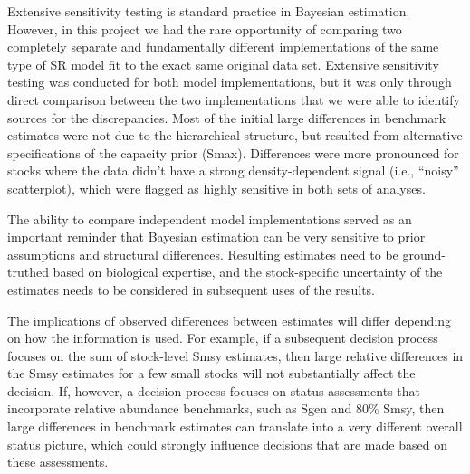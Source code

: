 \documentclass[french,11pt]{book}
\begin{document}
Extensive sensitivity testing is standard practice in Bayesian estimation. However, in this project we had the rare opportunity of comparing two completely separate and fundamentally different implementations of the same type of SR model fit to the exact same original data set. Extensive sensitivity testing was conducted for both model implementations, but it was only through direct comparison between the two implementations that we were able to identify sources for the discrepancies. Most of the initial large differences in benchmark estimates were not due to the hierarchical structure, but resulted from alternative specifications of the capacity prior (Smax). Differences were more pronounced for stocks where the data didn't have a strong density-dependent signal (i.e., ``noisy'' scatterplot), which were flagged as highly sensitive in both sets of analyses.

The ability to compare independent model implementations served as an important reminder that Bayesian estimation can be very sensitive to prior assumptions and structural differences. Resulting estimates need to be ground-truthed based on biological expertise, and the stock-specific uncertainty of the estimates needs to be considered in subsequent uses of the results.

The implications of observed differences between estimates will differ depending on how the information is used. For example, if a subsequent decision process focuses on the sum of stock-level Smsy estimates, then large relative differences in the Smsy estimates for a few small stocks will not substantially affect the decision. If, however, a decision process focuses on status assessments that incorporate relative abundance benchmarks, such as Sgen and 80\% Smsy, then large differences in benchmark estimates can translate into a very different overall status picture, which could strongly influence decisions that are made based on these assessments.
\end{document}
